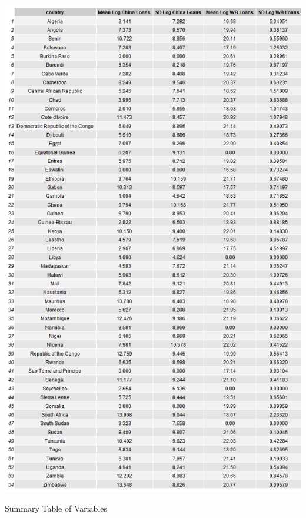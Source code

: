 \documentclass[12pt]{article}
\begin{document}
\begin{table}
    \centering
    \includegraphics[scale=0.53]{Figures/summary2.png}
    \caption{Summary Table of Variables}
\end{table}
\end{document}
